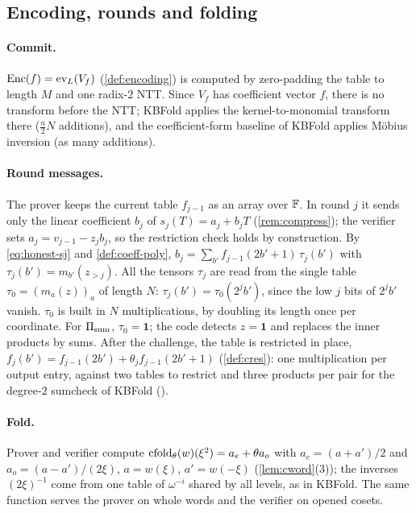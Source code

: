 \subsection{Encoding, rounds and folding}\label{sec:impl:enc}

\paragraph{Commit.}
$\mathrm{Enc}(f) = \mathrm{ev}_L(V_f)$ (\cref{def:encoding}) is computed by zero-padding the table to length $M$ and one radix-$2$ NTT. Since $V_f$ has coefficient vector $f$, there is no transform before the NTT; KBFold applies the kernel-to-monomial transform there ($\tfrac n2 N$ additions), and the coefficient-form baseline of KBFold applies M\"obius inversion (as many additions).

\paragraph{Round messages.}
The prover keeps the current table $f_{j-1}$ as an array over $\mathbb{F}$.
In round $j$ it sends only the linear coefficient $b_j$ of $s_j(T) = a_j + b_j T$ (\cref{rem:compress}); the verifier sets $a_j = v_{j-1} - z_j b_j$, so the restriction check holds by construction.
By \eqref{eq:honest-sj} and \cref{def:coeff-poly}, $b_j = \sum_{b'} f_{j-1}(2b'+1)\, \tau_j(b')$ with $\tau_j(b') = m_{b'}(z_{>j})$.
All the tensors $\tau_j$ are read from the single table $\tau_0 = (m_a(z))_{a}$ of length $N$: $\tau_j(b') = \tau_0(2^j b')$, since the low $j$ bits of $2^j b'$ vanish.
$\tau_0$ is built in $N$ multiplications, by doubling its length once per coordinate.
For $\Pi_{\mathrm{sum}}$, $\tau_0 = \mathbf 1$; the code detects $z = \mathbf 1$ and replaces the inner products by sums.
After the challenge, the table is restricted in place, $f_j(b') = f_{j-1}(2b') + \theta_j f_{j-1}(2b'+1)$ (\cref{def:cres}): one multiplication per output entry, against two tables to restrict and three products per pair for the degree-$2$ sumcheck of KBFold ().

\paragraph{Fold.}
Prover and verifier compute $\mathrm{cfold}_\theta(w)(\xi^2) = a_e + \theta a_o$ with $a_e = (a + a')/2$ and $a_o = (a - a')/(2\xi)$, $a = w(\xi)$, $a' = w(-\xi)$ (\cref{lem:cword}(3)); the inverses $(2\xi)^{-1}$ come from one table of $\omega^{-i}$ shared by all levels, as in KBFold.
The same function serves the prover on whole words and the verifier on opened cosets.

